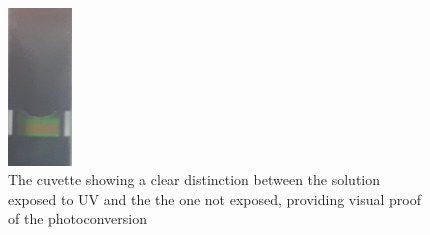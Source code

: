 \documentclass[a4paper,english,12pt,bibliography=totoc]{scrreprt}
\begin{document}
\begin{figure}[H]
    \centering
    \includegraphics[width = 0.15\textwidth]{Figures/WhatsApp Image 2024-06-24 at 10.49.14.jpeg}
    \caption{The cuvette showing a clear distinction between the solution exposed to UV and the the one not exposed, providing visual proof of the photoconversion}
    \label{fig:enter-label}
\end{figure}

\printbibliography
\end{document}
